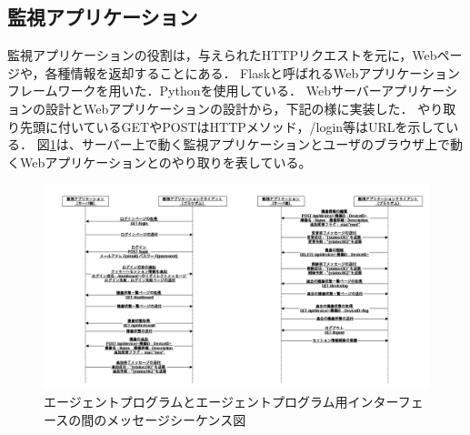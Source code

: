 \subsection{監視アプリケーション}
監視アプリケーションの役割は，与えられたHTTPリクエストを元に，Webページや，各種情報を返却することにある．
Flaskと呼ばれるWebアプリケーションフレームワークを用いた．Pythonを使用している．
Webサーバーアプリケーションの設計とWebアプリケーションの設計から，下記の様に実装した．
やり取り先頭に付いているGETやPOSTはHTTPメソッド，/login等はURLを示している．
図\ref{fig:diag_apps}は、サーバー上で動く監視アプリケーションとユーザのブラウザ上で動くWebアプリケーションとのやり取りを表している。
\begin{figure}[htbp]
\includegraphics[width=16cm]{images/diag_apps.png}
\caption{エージェントプログラムとエージェントプログラム用インターフェースの間のメッセージシーケンス図}
\label{fig:diag_apps}
\end{figure}


